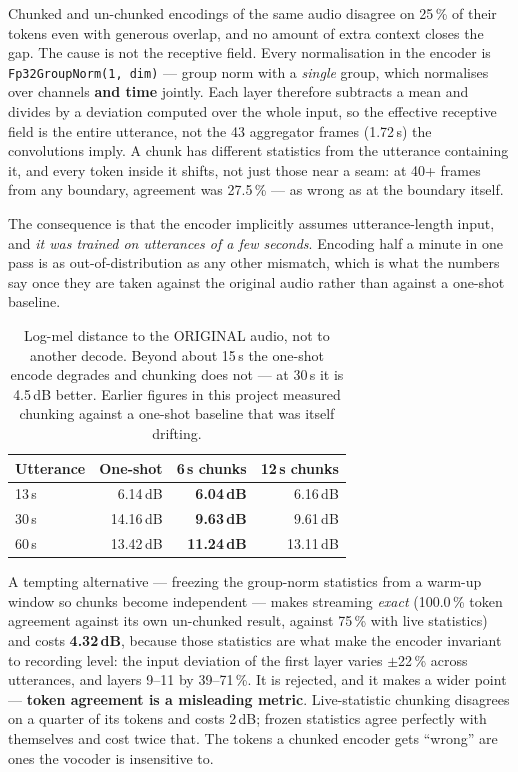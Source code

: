 Chunked and un-chunked encodings of the same audio disagree on 25\,\% of
their tokens even with generous overlap, and no amount of extra context
closes the gap.  The cause is not the receptive field.  Every
normalisation in the encoder is \texttt{Fp32GroupNorm(1, dim)} --- group
norm with a \emph{single} group, which normalises over channels
\textbf{and time} jointly.  Each layer therefore subtracts a mean and
divides by a deviation computed over the whole input, so the effective
receptive field is the entire utterance, not the 43 aggregator frames
(1.72\,s) the convolutions imply.  A chunk has different statistics from
the utterance containing it, and every token inside it shifts, not just
those near a seam: at 40+ frames from any boundary, agreement was
27.5\,\% --- as wrong as at the boundary itself.

The consequence is that the encoder implicitly assumes utterance-length
input, and \emph{it was trained on utterances of a few seconds}.
Encoding half a minute in one pass is as out-of-distribution as any
other mismatch, which is what the numbers say once they are taken
against the original audio rather than against a one-shot baseline.

\begin{table}[H]
    \centering
    \caption{Log-mel distance to the ORIGINAL audio, not to another
             decode.  Beyond about 15\,s the one-shot encode degrades
             and chunking does not --- at 30\,s it is 4.5\,dB better.
             Earlier figures in this project measured chunking against
             a one-shot baseline that was itself drifting.}
    \label{tab:voice_stream_len}
    \small
    \begin{tabular}{@{}lrrr@{}}
    \toprule
    \textbf{Utterance} & \textbf{One-shot} & \textbf{6\,s chunks} &
    \textbf{12\,s chunks} \\
    \midrule
    13\,s &  6.14\,dB & \textbf{6.04\,dB} &  6.16\,dB \\
    30\,s & 14.16\,dB & \textbf{9.63\,dB} &  9.61\,dB \\
    60\,s & 13.42\,dB & \textbf{11.24\,dB} & 13.11\,dB \\
    \bottomrule
    \end{tabular}
\end{table}

A tempting alternative --- freezing the group-norm statistics from a
warm-up window so chunks become independent --- makes streaming
\emph{exact} (100.0\,\% token agreement against its own un-chunked
result, against 75\,\% with live statistics) and costs \textbf{4.32\,dB},
because those statistics are what make the encoder invariant to
recording level: the input deviation of the first layer varies
$\pm$22\,\% across utterances, and layers 9--11 by 39--71\,\%.  It is
rejected, and it makes a wider point --- \textbf{token agreement is a
misleading metric}.  Live-statistic chunking disagrees on a quarter of
its tokens and costs 2\,dB; frozen statistics agree perfectly with
themselves and cost twice that.  The tokens a chunked encoder gets
``wrong'' are ones the vocoder is insensitive to.

